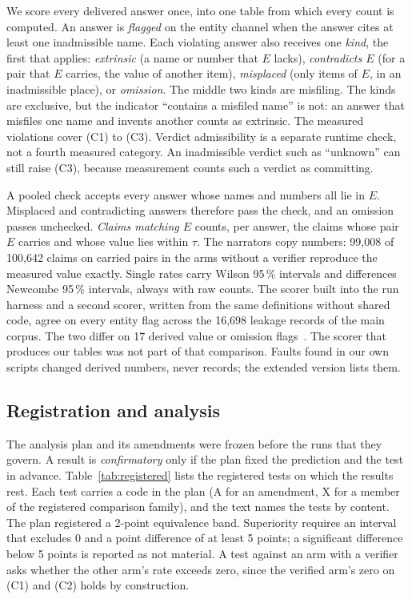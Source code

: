 \documentclass[journal]{IEEEtran}
\begin{document}
We score every delivered answer once, into one table from which every count is
computed. An answer is \emph{flagged} on the entity channel when the answer cites
at least one inadmissible name. Each violating answer also receives one
\emph{kind}, the first that applies: \emph{extrinsic} (a name or number that $E$
lacks), \emph{contradicts $E$} (for a pair that $E$ carries, the value of another
item), \emph{misplaced} (only items of $E$, in an inadmissible place), or
\emph{omission}. The middle two kinds are misfiling. The kinds are exclusive, but
the indicator ``contains a misfiled name'' is not: an answer that misfiles one
name and invents another counts as extrinsic. The measured violations cover (C1)
to (C3). Verdict admissibility is a separate runtime check, not a fourth measured
category. An inadmissible verdict such as ``unknown'' can still raise (C3),
because measurement counts such a verdict as committing.

A pooled check accepts every answer whose names and numbers all lie in $E$.
Misplaced and contradicting answers therefore pass the check, and an omission
passes unchecked. \emph{Claims matching $E$} counts, per answer, the claims whose
pair $E$ carries and whose value lies within $\tau$. The narrators copy numbers:
99{,}008 of 100{,}642 claims on carried pairs in the arms without a verifier
reproduce the measured value exactly. Single rates carry Wilson 95\,\% intervals
and differences Newcombe 95\,\% intervals, always with raw counts. The scorer
built into the run harness and a second scorer, written from the same
definitions without shared code, agree on every entity flag across the
16{,}698 leakage records of the main corpus. The two differ on 17 derived value
or omission flags~\cite{extended}. The scorer that produces our tables was not
part of that comparison. Faults found in our own scripts changed derived numbers,
never records; the extended version lists them.

\subsection{Registration and analysis}

The analysis plan and its amendments were frozen before the runs that they
govern. A result is \emph{confirmatory} only if the plan fixed the prediction and
the test in advance. Table~\ref{tab:registered} lists the registered tests on
which the results rest. Each test carries a code in the plan (A for an
amendment, X for a member of the registered comparison family), and the text
names the tests by content. The plan registered a 2-point equivalence band.
Superiority requires an interval that excludes 0 and a point difference of at
least 5 points; a significant difference below 5 points is reported as not
material. A test against an arm with a verifier asks whether the other arm's rate
exceeds zero, since the verified arm's zero on (C1) and (C2) holds by
construction.
\end{document}
